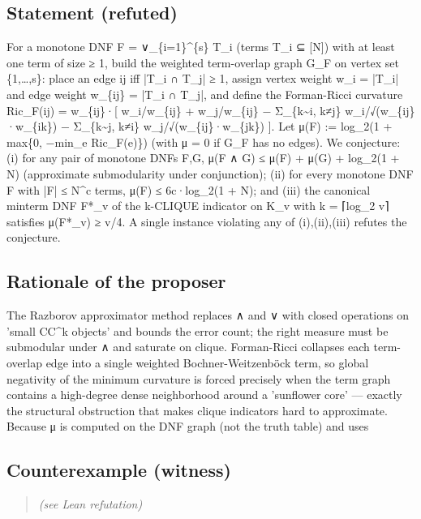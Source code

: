 \documentclass[11pt,a4paper]{article}
\begin{document}
\subsection*{Statement (refuted)}
For a monotone DNF F = ∨\_\{i=1\}\textasciicircum{}\{s\} T\_i (terms T\_i ⊆ [N]) with at least one term of size ≥ 1, build the weighted term-overlap graph G\_F on vertex set \{1,…,s\}: place an edge ij iff |T\_i ∩ T\_j| ≥ 1, assign vertex weight w\_i = |T\_i| and edge weight w\_\{ij\} = |T\_i ∩ T\_j|, and define the Forman-Ricci curvature Ric\_F(ij) = w\_\{ij\}·[ w\_i/w\_\{ij\} + w\_j/w\_\{ij\} − Σ\_\{k\textasciitilde{}i, k≠j\} w\_i/√(w\_\{ij\}·w\_\{ik\}) − Σ\_\{k\textasciitilde{}j, k≠i\} w\_j/√(w\_\{ij\}·w\_\{jk\}) ]. Let μ(F) := log\_2(1 + max\{0, −min\_e Ric\_F(e)\}) (with μ = 0 if G\_F has no edges). We conjecture: (i) for any pair of monotone DNFs F,G, μ(F ∧ G) ≤ μ(F) + μ(G) + log\_2(1 + N) (approximate submodularity under conjunction); (ii) for every monotone DNF F with |F| ≤ N\textasciicircum{}c terms, μ(F) ≤ 6c·log\_2(1 + N); and (iii) the canonical minterm DNF F*\_v of the k-CLIQUE indicator on K\_v with k = ⌈log\_2 v⌉ satisfies μ(F*\_v) ≥ v/4. A single instance violating any of (i),(ii),(iii) refutes the conjecture.

\subsection*{Rationale of the proposer}
The Razborov approximator method replaces ∧ and ∨ with closed operations on 'small CC\textasciicircum{}k objects' and bounds the error count; the right measure must be submodular under ∧ and saturate on clique. Forman-Ricci collapses each term-overlap edge into a single weighted Bochner-Weitzenböck term, so global negativity of the minimum curvature is forced precisely when the term graph contains a high-degree dense neighborhood around a 'sunflower core' — exactly the structural obstruction that makes clique indicators hard to approximate. Because μ is computed on the DNF graph (not the truth table) and uses 

\subsection*{Counterexample (witness)}
\begin{quote}\itshape
(see Lean refutation)
\end{quote}
\end{document}
